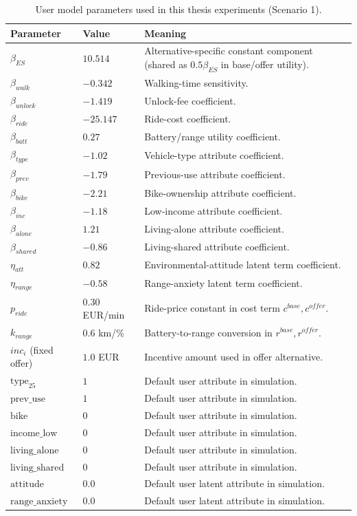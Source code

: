 \begin{table}[H]
\centering
\caption{User model parameters used in this thesis experiments (Scenario 1).}
\label{tab:user-model-params}
\begin{tabular}{p{4.5cm}p{3.5cm}p{6.0cm}}
\toprule
\textbf{Parameter} & \textbf{Value} & \textbf{Meaning} \\
\midrule
\(\beta_{ES}\) & \(10.514\) & Alternative-specific constant component (shared as \(0.5\beta_{ES}\) in base/offer utility). \\
\(\beta_{walk}\) & \(-0.342\) & Walking-time sensitivity. \\
\(\beta_{unlock}\) & \(-1.419\) & Unlock-fee coefficient. \\
\(\beta_{ride}\) & \(-25.147\) & Ride-cost coefficient. \\
\(\beta_{batt}\) & \(0.27\) & Battery/range utility coefficient. \\
\(\beta_{type}\) & \(-1.02\) & Vehicle-type attribute coefficient. \\
\(\beta_{prev}\) & \(-1.79\) & Previous-use attribute coefficient. \\
\(\beta_{bike}\) & \(-2.21\) & Bike-ownership attribute coefficient. \\
\(\beta_{inc}\) & \(-1.18\) & Low-income attribute coefficient. \\
\(\beta_{alone}\) & \(1.21\) & Living-alone attribute coefficient. \\
\(\beta_{shared}\) & \(-0.86\) & Living-shared attribute coefficient. \\
\(\eta_{att}\) & \(0.82\) & Environmental-attitude latent term coefficient. \\
\(\eta_{range}\) & \(-0.58\) & Range-anxiety latent term coefficient. \\
\midrule
\(p_{ride}\) & \(0.30\) EUR/min & Ride-price constant in cost term \(c^{base},c^{offer}\). \\
\(k_{range}\) & \(0.6\) km/\% & Battery-to-range conversion in \(r^{base},r^{offer}\). \\
\(inc_i\) (fixed offer) & \(1.0\) EUR & Incentive amount used in offer alternative. \\
\midrule
\(\text{type}_{25}\) & \(1\) & Default user attribute in simulation. \\
\(\text{prev\_use}\) & \(1\) & Default user attribute in simulation. \\
\(\text{bike}\) & \(0\) & Default user attribute in simulation. \\
\(\text{income\_low}\) & \(0\) & Default user attribute in simulation. \\
\(\text{living\_alone}\) & \(0\) & Default user attribute in simulation. \\
\(\text{living\_shared}\) & \(0\) & Default user attribute in simulation. \\
\(\text{attitude}\) & \(0.0\) & Default user latent attribute in simulation. \\
\(\text{range\_anxiety}\) & \(0.0\) & Default user latent attribute in simulation. \\
\bottomrule
\end{tabular}
\end{table}

